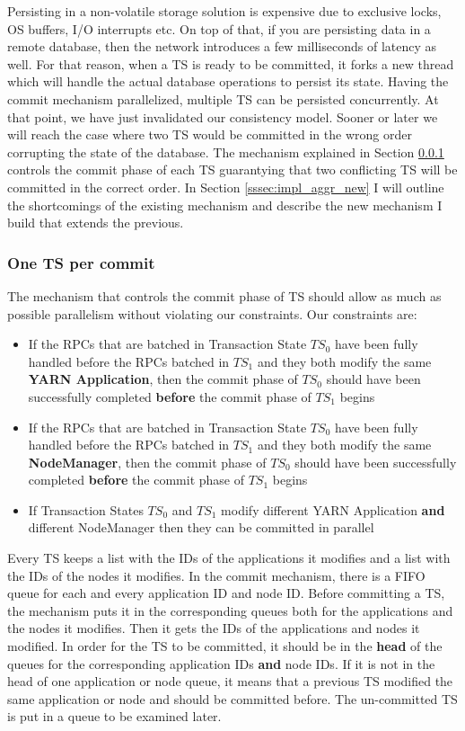 Persisting in a non-volatile storage solution is expensive due to
exclusive locks, OS buffers, I/O interrupts etc. On top of that, if you are
persisting data in a remote database, then the network introduces a
few milliseconds of latency as well. For that reason, when a TS is ready to be committed, it forks
a new thread which will handle the actual database operations to
persist its state. Having the commit mechanism parallelized, multiple
TS can be persisted concurrently. At that point, we have just
invalidated our consistency model. Sooner or later we will
reach the case where two TS would be committed in the wrong order
corrupting the state of the database. The mechanism explained in
Section \ref{sssec:impl_aggr_old} controls the commit phase of each TS
guarantying that two conflicting TS will be committed in the correct
order. In Section \ref{sssec:impl_aggr_new} I will outline the
shortcomings of the existing mechanism and describe the new mechanism
I build that extends the previous.

\subsubsection{One TS per commit}
\label{sssec:impl_aggr_old}
The mechanism that controls the commit phase of TS should allow as
much as possible parallelism without violating our constraints. Our
constraints are:
\begin{itemize}
\item If the RPCs that are batched in Transaction State $TS_0$ have
  been fully handled before the RPCs batched in $TS_1$ and they both
  modify the same \textbf{YARN Application}, then the commit phase of $TS_0$
  should have been successfully completed \textbf{before} the commit
  phase of $TS_1$ begins

\item If the RPCs that are batched in Transaction State $TS_0$ have
  been fully handled before the RPCs batched in $TS_1$ and they both
  modify the same \textbf{NodeManager}, then the commit phase of $TS_0$
  should have been successfully completed \textbf{before} the commit
  phase of $TS_1$ begins

\item If Transaction States $TS_0$ and $TS_1$ modify different YARN
  Application \textbf{and} different NodeManager then they can be committed in parallel
\end{itemize}

Every TS keeps a list with the IDs of the applications it modifies and
a list with the IDs of the nodes it modifies. In the commit mechanism,
there is a FIFO queue for each and every application ID and node
ID. Before committing a TS, the mechanism puts it in the corresponding
queues both for the applications and the nodes it modifies. Then it
gets the IDs of the applications and nodes it modified. In order for
the TS to be committed, it should be in the \textbf{head} of the
queues for the corresponding application IDs \textbf{and} node IDs. If
it is not in the head of one application or node queue, it means that
a previous TS modified the same application or node and should be
committed before. The un-committed TS is put in a queue to be
examined later.

